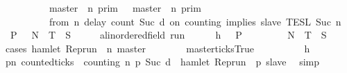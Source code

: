 \begin{isabellebody}
\ \ \ \ \ \ \ \ {\isacharequal}\ {\isasymlbrakk}\ master\ {\isasymnot}{\isasymUp}\ n\ {\isasymrbrakk}\isactrlsub p\isactrlsub r\isactrlsub i\isactrlsub m\ {\isasymunion}\ {\isasymlbrakk}\ master\ {\isasymUp}\ n\ {\isasymrbrakk}\isactrlsub p\isactrlsub r\isactrlsub i\isactrlsub m\isanewline
\ \ \ \ \ \ \ \ {\isasyminter}\ {\isasymlbrakk}\ from\ n\ delay\ count\ {\isacharparenleft}Suc\ d{\isacharparenright}\ on\ counting\ implies\ slave\ {\isasymrbrakk}\isactrlsub T\isactrlsub E\isactrlsub S\isactrlsub L\isactrlbsup {\isasymge}\ Suc\ n\isactrlesup {\isacartoucheclose}\ {\isacharparenleft}\ {\isacartoucheopen}{\isacharbraceleft}{\isasymrho}{\isachardot}\ {\isacharquery}P\ {\isasymrho}{\isacharbraceright}\ {\isacharequal}\ {\isacharquery}N\ {\isasymunion}\ {\isacharquery}T\ {\isasyminter}\ {\isacharquery}S{\isacartoucheclose}{\isacharparenright}\isanewline
%
\isadelimproof
%
\endisadelimproof
%
\isatagproof
{}\isamarkupfalse%
\isanewline
\ \ \isacommand{{\isacharbraceleft}}\isamarkupfalse%
\ \isamarkupfalse%
\ {\isasymrho}{\isacharcolon}{\isacharcolon}{\isacartoucheopen}{\isacharparenleft}{\isacharprime}a{\isacharcolon}{\isacharcolon}linordered{\isacharunderscore}field{\isacharparenright}\ run{\isacartoucheclose}\isanewline
\ \ \ \ \isamarkupfalse%
\ h{\isacharcolon}{\isacartoucheopen}{\isasymrho}\ {\isasymin}\ {\isacharbraceleft}{\isasymrho}{\isachardot}\ {\isacharquery}P\ {\isasymrho}{\isacharbraceright}{\isacartoucheclose}\isanewline
\ \ \ \ \isamarkupfalse%
\ {\isacartoucheopen}{\isasymrho}\ {\isasymin}\ {\isacharquery}N\ {\isasymunion}\ {\isacharquery}T\ {\isasyminter}\ {\isacharquery}S{\isacartoucheclose}\isanewline
\ \ \ \ \isamarkupfalse%
\ {\isacharparenleft}cases\ {\isacartoucheopen}hamlet\ {\isacharparenleft}Rep{\isacharunderscore}run\ {\isasymrho}\ n\ master{\isacharparenright}{\isacartoucheclose}{\isacharparenright}\isanewline
\ \ \ \ \ \ \isamarkupfalse%
\ master{\isacharunderscore}ticks{\isacharcolon}True\isanewline
\ \ \ \ \ \ \ \ \isamarkupfalse%
\ h\ \isamarkupfalse%
\ {\isacartoucheopen}{\isacharparenleft}{\isasymforall}p{\isasymge}n{\isachardot}\ counted{\isacharunderscore}ticks\ {\isasymrho}\ counting\ n\ p\ {\isacharparenleft}Suc\ d{\isacharparenright}\ {\isasymlongrightarrow}\ hamlet\ {\isacharparenleft}Rep{\isacharunderscore}run\ {\isasymrho}\ p\ slave{\isacharparenright}{\isacharparenright}{\isacartoucheclose}\ \isamarkupfalse%
\ simp\isanewline
\ \ \ \ \ \ \ \ \isamarkupfalse%

\end{isabellebody}
